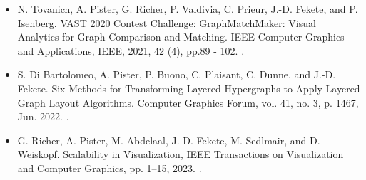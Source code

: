 \begin{itemize}
    \item N. Tovanich, A. Pister, G. Richer, P. Valdivia, C. Prieur, J.-D. Fekete, and P. Isenberg. VAST 2020 Contest Challenge: GraphMatchMaker: Visual Analytics for Graph Comparison and Matching. IEEE Computer Graphics and Applications, IEEE, 2021, 42 (4), pp.89 - 102. .
    \item S. Di Bartolomeo, A. Pister, P. Buono, C. Plaisant, C. Dunne, and J.-D. Fekete. Six Methods for Transforming Layered Hypergraphs to Apply Layered Graph Layout Algorithms. Computer Graphics Forum, vol. 41, no. 3, p. 1467, Jun. 2022. .
    \item G. Richer, A. Pister, M. Abdelaal, J.-D. Fekete, M. Sedlmair, and D. Weiskopf. Scalability in Visualization, IEEE Transactions on Visualization and Computer Graphics, pp. 1–15, 2023. .
\end{itemize}

